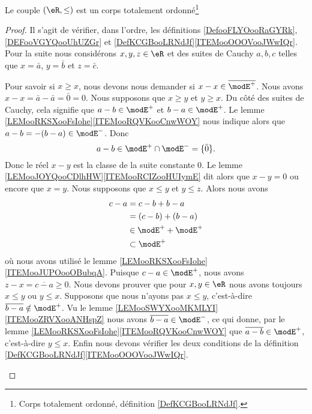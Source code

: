 \begin{proposition} \label{PROPooYMJVooNAsXae}
	Le couple \( (\eR,\leq)\) est un corps totalement ordonné\footnote{Corps totalement ordonné, définition \ref{DefKCGBooLRNdJf}.}
\end{proposition}

\begin{proof}
	Il s'agit de vérifier, dans l'ordre, les définitions \ref{DefooFLYOooRaGYRk}, \ref{DEFooVGYQooUhUZGr} et \ref{DefKCGBooLRNdJf}\ref{ITEMooOOOVooJWwIQr}. Pour la suite nous considérons \( x,y,z\in \eR\) et des suites de Cauchy \( a,b,c\) telles que \( x=\bar a\), \( y=\bar b\) et \( z=\bar c\).
	\begin{subproof}
		\spitem[Réflexivité]
		Pour savoir si \( x\geq x\), nous devons nous demander si \( x-x\in\overline{ \modE^+ }\). Nous avons \( x-x=\bar a-\bar a=\bar 0=0\).
		\spitem[antisymétrie]
		Nous supposons que \( x\geq y\) et \( y\geq x\). Du côté des suites de Cauchy, cela signifie que \( a-b\in\modE^+\) et \( b-a\in \modE^+\). Le lemme \ref{LEMooRKSXooFsIohe}\ref{ITEMooRQVKooCnwWOY} nous indique alors que \( a-b=-(b-a)\in \modE^-\). Donc
		\begin{equation}
			a-b\in\modE^+\cap\modE^-=\{ \bar 0 \}.
		\end{equation}
		Donc le réel \( x-y\) est la classe de la suite constante \( 0\). Le lemme \ref{LEMooJOYQooCDlhHW}\ref{ITEMooRCIZooHUIymE} dit alors que \( x-y=0\) ou encore que \( x=y\).
		\spitem[transitivité]
		Nous supposons que \( x\leq y\) et \( y\leq z\). Alors nous avons
		\begin{subequations}
			\begin{align}
				c-a & =c-b+b-a            \\
				    & =(c-b)+(b-a)        \\
				    & \in \modE^++\modE^+ \\
				    & \subset \modE^+
			\end{align}
		\end{subequations}
		où nous avons utilisé le lemme \ref{LEMooRKSXooFsIohe}\ref{ITEMooJUPOooOBubqA}. Puisque \( c-a\in\modE^+\), nous avons \( z-x=\overline{ c-a }\geq 0\).
		Nous devons prouver que pour \( x,y\in \eR\) nous avons toujours \( x\leq y\) ou \( y\leq x\). Supposons que nous n'ayons pas \( x\leq y\), c'est-à-dire \( \overline{ b-a }\notin \modE^+\). Vu le lemme \ref{LEMooSWYXooMKMLYI}\ref{ITEMooZRVXooANHspZ} nous avons \( \overline{ b-a }\in \modE^-\), ce qui donne, par le lemme \ref{LEMooRKSXooFsIohe}\ref{ITEMooRQVKooCnwWOY} que \( \overline{ a-b }\in \modE^+\), c'est-à-dire \( y\leq x\).
		Enfin nous devons vérifier les deux conditions de la définition \ref{DefKCGBooLRNdJf}\ref{ITEMooOOOVooJWwIQr}.


\end{subproof}
\end{proof}
